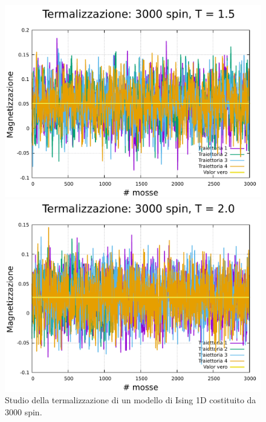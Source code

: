 \begin{figure}[htbp]
    \begin{minipage}{0.45\textwidth}  
      \centering
      \includegraphics[page=1, width=\textwidth]{Immagini/simIsing1D/term/term_3000_1.5.pdf}
      \caption{$T\,=\,1.5$}
    \end{minipage}\hfill
    \begin{minipage}{0.45\textwidth}  
      \centering
      \includegraphics[page=1, width=\textwidth]{Immagini/simIsing1D/term/term_3000_2.0.pdf}
      \caption{$T\,=\,2.0$}
    \end{minipage}
    \caption{Studio della termalizzazione di un modello di Ising 1D costituito da 3000 spin.}
\end{figure}

